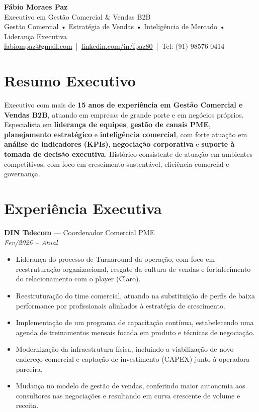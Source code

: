 \documentclass[11pt,a4paper]{article}
\begin{document}
{\Huge \textbf{Fábio Moraes Paz}}\\[6pt]
{\large Executivo em Gestão Comercial \& Vendas B2B}\\[10pt]

\textcolor{accent}{
Gestão Comercial • Estratégia de Vendas • Inteligência de Mercado • Liderança Executiva
}\\[12pt]

\href{mailto:fabiompaz@gmail.com}{fabiompaz@gmail.com} \,|\, 
\href{https://linkedin.com/in/fpaz80}{linkedin.com/in/fpaz80} \,|\, 
Tel: (91) 98576-0414

\vspace{18pt}

\section*{Resumo Executivo}

Executivo com mais de \textbf{15 anos de experiência em Gestão Comercial e Vendas B2B}, atuando em empresas de grande porte e em negócios próprios. Especialista em \textbf{liderança de equipes}, \textbf{gestão de canais PME}, \textbf{planejamento estratégico} e \textbf{inteligência comercial}, com forte atuação em \textbf{análise de indicadores (KPIs)}, \textbf{negociação corporativa} e \textbf{suporte à tomada de decisão executiva}. Histórico consistente de atuação em ambientes competitivos, com foco em crescimento sustentável, eficiência comercial e governança.

\vspace{14pt}

\section*{Experiência Executiva}

\textbf{DIN Telecom} — Coordenador Comercial PME\\
\textit{Fev/2026 -- Atual}

\begin{itemize}
\item Liderança do processo de Turnaround da operação, com foco em reestruturação organizacional, resgate da cultura de vendas e fortalecimento do relacionamento com o player (Claro).
\item Reestruturação do time comercial, atuando na substituição de perfis de baixa performance por profissionais alinhados à estratégia de crescimento.
\item Implementação de um programa de capacitação contínua, estabelecendo uma agenda de treinamentos mensais focada em produto e técnicas de negociação.
\item Modernização da infraestrutura física, incluindo a viabilização de novo endereço comercial e captação de investimento (CAPEX) junto à operadora parceira.
\item Mudança no modelo de gestão de vendas, conferindo maior autonomia aos consultores nas negociações e resultando em curva crescente de volume e receita.
\end{itemize}
\end{document}
